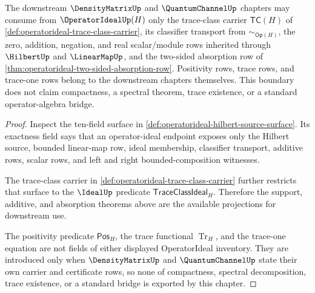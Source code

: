 \begin{theorem}
\label{thm:operatorideal-densitymatrix-trace-class-boundary}
The downstream $\DensityMatrixUp$ and $\QuantumChannelUp$ chapters may consume from $\OperatorIdealUp(H)$ only the trace-class carrier $\mathsf{TC}(H)$ of \autoref{def:operatorideal-trace-class-carrier}, its classifier transport from $\sim_{\mathsf{Op}(H)}$, the zero, addition, negation, and real scalar/module rows inherited through $\HilbertUp$ and $\LinearMapUp$, and the two-sided absorption row of \autoref{thm:operatorideal-two-sided-absorption-row}. Positivity rows, trace rows, and trace-one rows belong to the downstream chapters themselves. This boundary does not claim compactness, a spectral theorem, trace existence, or a standard operator-algebra bridge.
\end{theorem}
\begin{proof}
Inspect the ten-field surface in \autoref{def:operatorideal-hilbert-source-surface}. Its exactness field says that an operator-ideal endpoint exposes only the Hilbert source, bounded linear-map row, ideal membership, classifier transport, additive rows, scalar rows, and left and right bounded-composition witnesses.

The trace-class carrier in \autoref{def:operatorideal-trace-class-carrier} further restricts that surface to the $\IdealUp$ predicate $\mathsf{TraceClassIdeal}_H$. Therefore the support, additive, and absorption theorems above are the available projections for downstream use.

The positivity predicate $\mathsf{Pos}_H$, the trace functional $\operatorname{Tr}_H$, and the trace-one equation are not fields of either displayed OperatorIdeal inventory. They are introduced only when $\DensityMatrixUp$ and $\QuantumChannelUp$ state their own carrier and certificate rows, so none of compactness, spectral decomposition, trace existence, or a standard bridge is exported by this chapter.
\end{proof}

